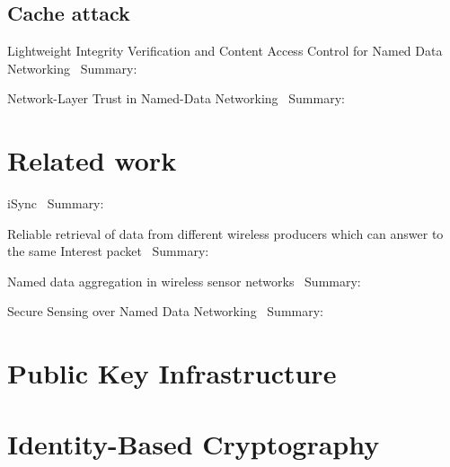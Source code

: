 \subsection{Cache attack}

Lightweight Integrity Verification and Content Access Control for Named Data Networking~\cite{DBLP:journals/tifs/LiZZSF15}
Summary:


Network-Layer Trust in Named-Data Networking~\cite{DBLP:journals/ccr/GhaliTU14}
Summary:


\section{Related work}
iSync~\cite{DBLP:conf/acmicn/FuAC14}
Summary:


Reliable retrieval of data from different wireless producers which can answer to the same Interest packet~\cite{DBLP:conf/acmicn/AmadeoCM14}
Summary:


Named data aggregation in wireless sensor networks~\cite{DBLP:conf/noms/AbidySLF14}
Summary:


Secure Sensing over Named Data Networking~\cite{DBLP:conf/nca/BurkeGNT14}
Summary:

\section{Public Key Infrastructure}

\section{Identity-Based Cryptography}